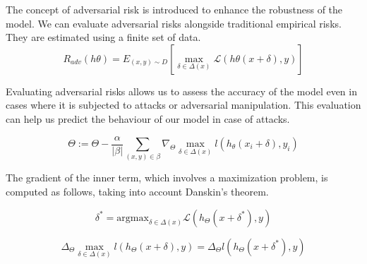 The concept of adversarial risk is introduced to enhance the robustness of the model. We can evaluate adversarial risks alongside traditional empirical risks. They are estimated using a finite set of data.
\[ R_{adv}(h\theta) = E_{(x,y) \sim D} \left[ \max_{\delta \in \Delta(x)} \mathcal{L}(h\theta(x+\delta),y) \right] \]

Evaluating adversarial risks allows us to assess the accuracy of the model even in cases where it is subjected to attacks or adversarial manipulation. This evaluation can help us predict
the behaviour of our model in case of attacks. 

\[ \Theta := \Theta - \dfrac{\alpha}{|\beta|} \sum_{(x, y) \in \beta} \nabla_\Theta \max_{\delta \in \Delta(x)} l (h_{\theta}(x_{i}+\delta), y_{i}) \]


The gradient of the inner term, which involves a maximization problem, is computed as follows, taking into account Danskin's theorem.%

\[\delta^* = \text{argmax}_{\delta \in \Delta(x)} \mathcal{L}(h_{\Theta}(x + \delta^*), y)\]

\[\Delta_\Theta \max_{\delta \in \Delta(x)} l (h_\Theta(x+\delta), y) = \Delta_\Theta l (h_\Theta(x + \delta^*), y)\]